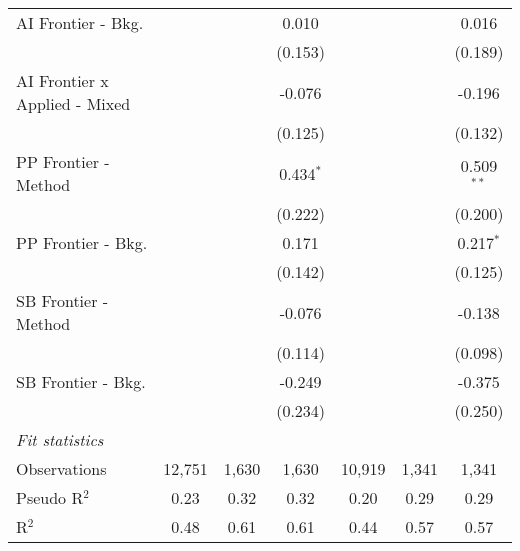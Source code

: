 \begin{tabular}{lcccccc}
   AI Frontier - Bkg.            &             &             & 0.010       &              &               & 0.016\\   
                                 &             &             & (0.153)     &              &               & (0.189)\\   
   AI Frontier x Applied - Mixed &             &             & -0.076      &              &               & -0.196\\   
                                 &             &             & (0.125)     &              &               & (0.132)\\   
   PP Frontier - Method          &             &             & 0.434$^{*}$ &              &               & 0.509$^{**}$\\   
                                 &             &             & (0.222)     &              &               & (0.200)\\   
   PP Frontier - Bkg.            &             &             & 0.171       &              &               & 0.217$^{*}$\\   
                                 &             &             & (0.142)     &              &               & (0.125)\\   
   SB Frontier - Method          &             &             & -0.076      &              &               & -0.138\\   
                                 &             &             & (0.114)     &              &               & (0.098)\\   
   SB Frontier - Bkg.            &             &             & -0.249      &              &               & -0.375\\   
                                 &             &             & (0.234)     &              &               & (0.250)\\   
   \midrule
   \emph{Fit statistics}\\
   Observations                  & 12,751      & 1,630       & 1,630       & 10,919       & 1,341         & 1,341\\  
   Pseudo R$^2$                  & 0.23        & 0.32        & 0.32        & 0.20         & 0.29          & 0.29\\  
   R$^2$                         & 0.48        & 0.61        & 0.61        & 0.44         & 0.57          & 0.57\\  
   

\end{tabular}
